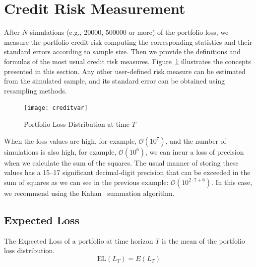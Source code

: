 \documentclass[11pt,fleqn]{book} %
\begin{document}
\section{Credit Risk Measurement}
\label{sec:riskm}

After $N$ simulations (e.g., \num{20000}, \num{500000} or more) of the 
portfolio loss, we measure the portfolio credit risk computing the 
corresponding statistics and their standard errors according to sample size. 
Then we provide the definitions and formulas of the most usual credit risk 
measures. Figure~\ref{fig:lossdistr} illustrates the concepts presented in 
this section. Any other user-defined risk measure can be estimated from the 
simulated sample, and its standard error can be obtained using resampling 
methods.
\begin{figure}[!ht]
	\centering
	\texttt{[image: creditvar]}
	\caption{Portfolio Loss Distribution at time $T$}
	\label{fig:lossdistr}
\end{figure}

When the loss values are high, for example, $\mathcal{O}(10^7)$, and the 
number of simulations is also high, for example, $\mathcal{O}(10^6)$, we 
can incur a loss of precision when we calculate the sum of the squares. 
The usual manner of storing these values has a 15--17 significant 
decimal-digit precision that can be exceeded in the sum of squares as we 
can see in the previous example: $\mathcal{O}(10^{2 \cdot 7 + 6})$. In 
this case, we recommend using the Kahan~\cite{kahan:1965} summation 
algorithm.

\subsection{Expected Loss}

\begin{definition}
	The Expected Loss of a portfolio at time horizon $T$ is the 
	mean of the portfolio loss distribution.
	\begin{displaymath}
		\text{EL}(L_T) = E(L_T)
	\end{displaymath}
\end{definition}
\end{document}
